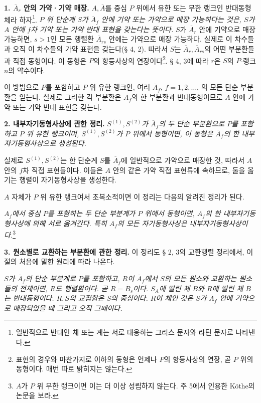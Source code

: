 \noindent\textbf{1. \(\overline A_r\) 안의 가약·기약 매장.} \(A,\overline A\)를 중심 \(P\) 위에서 유한 또는 무한 랭크인 반대동형체라 하자\footnote{일반적으로 반대인 체 또는 계는 서로 대응하는 그리스 문자와 라틴 문자로 나타낸다.}. \emph{\(P\) 위 단순계 \(S\)가 \(\overline A_f\) 안에 기약 또는 가약으로 매장 가능하다는 것은, \(S\)가 \(A\) 안에 \(f\)차 기약 또는 가약 반대 표현을 갖는다는 뜻이다.} \(S\)가 \(\overline A_r\) 안에 기약으로 매장 가능하면, \(s>1\)인 모든 행렬환 \(\overline A_{rs}\) 안에는 가약으로 매장 가능하다. 실제로 이 차수들과 오직 이 차수들의 가약 표현을 갖는다(§ 4, 2). 따라서 \(S\)는 \(\overline A_r,\overline A_{rs}\)의 어떤 부분환들과 직접 동형이다. 이 동형은 \(P\)의 항등사상의 연장이다\footnote{표현의 경우와 마찬가지로 이하의 동형은 언제나 \(P\)의 항등사상의 연장, 곧 \(P\) 위의 동형이다. 매번 따로 밝히지는 않는다.}. § 4, 3에 따라 \(r\)은 \(S\)의 \(P\)-랭크 \(n\)의 약수이다.

이 방법으로 \(P\)를 포함하고 \(P\) 위 유한 랭크인, 여러 \(\overline A_f\), \(f=1,2,\ldots\), 의 모든 단순 부분환을 얻는다. 실제로 그러한 각 부분환은 \(A_f\)의 한 부분환과 반대동형이므로 \(A\) 안에 가약 또는 기약 반대 표현을 갖는다.

\noindent\textbf{2. 내부자기동형사상에 관한 정리.} \emph{\(S^{(1)},S^{(2)}\)가 \(\overline A_f\)의 두 단순 부분환으로 \(P\)를 포함하고 \(P\) 위 유한 랭크이며, \(S^{(1)},S^{(2)}\)가 \(P\) 위에서 동형이면, 이 동형은 \(\overline A_f\)의 한 내부자기동형사상으로 생성된다.}

실제로 \(S^{(1)},S^{(2)}\)는 한 단순계 \(S\)를 \(\overline A_f\)에 일반적으로 가약으로 매장한 것, 따라서 \(A\) 안의 \(f\)차 직접 표현들이다. 이들은 \(A\) 안의 같은 가약 직접 표현류에 속하므로, 둘을 옮기는 행렬이 자기동형사상을 생성한다.

\(A\) 자체가 \(P\) 위 유한 랭크여서 초복소적이면 이 정리는 다음의 알려진 정리가 된다.

\emph{\(A_f\)에서 중심 \(P\)를 포함하는 두 단순 부분계가 \(P\) 위에서 동형이면, \(A_f\)의 한 내부자기동형사상에 의해 서로 옮겨간다. 특히 \(A_f\)의 모든 자기동형사상은 내부자기동형사상이다.}\footnote{\normalfont \(A\)가 \(P\) 위 무한 랭크이면 이는 더 이상 성립하지 않는다. 주 5에서 인용한 Köthe의 논문을 보라.}

\noindent\textbf{3. 원소별로 교환하는 부분환에 관한 정리.}
이 정리도 § 2, 3의 교환행렬 정리에서, 이 절의 처음에 말한 원리에 따라 나온다.

\emph{\(S\)가 \(\overline A_f\)의 단순 부분계로 \(P\)를 포함하고, \(R\)이 \(\overline A_f\)에서 \(S\)의 모든 원소와 교환하는 원소들의 전체이면, \(R\)도 행렬환이다. 곧 \(R=\overline B_s\)이다. \(S_A\)에 딸린 체 \(B\)와 \(R\)에 딸린 체 \(\overline B\)는 반대동형이다. \(R,S\)의 교집합은 \(S\)의 중심이다. \(R\)이 체인 것은 \(S\)가 \(\overline A_f\) 안에 기약으로 매장되었을 때 그리고 오직 그때이다.}


